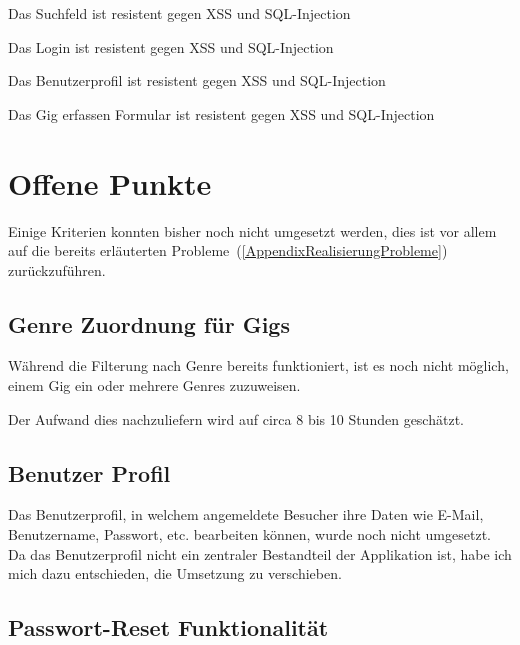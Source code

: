 \clearpage

{Das Suchfeld ist resistent gegen XSS und SQL-Injection}

{Das Login ist resistent gegen XSS und SQL-Injection}

\clearpage

{Das Benutzerprofil ist resistent gegen XSS und SQL-Injection}

{Das Gig erfassen Formular ist resistent gegen XSS und SQL-Injection}

\clearpage
\section{Offene Punkte}

Einige Kriterien konnten bisher noch nicht umgesetzt werden, dies ist vor allem
auf die bereits erläuterten Probleme~(\ref{AppendixRealisierungProbleme})
zurückzuführen.

\subsection{Genre Zuordnung für Gigs}

Während die Filterung nach Genre bereits funktioniert, ist es noch nicht
möglich, einem Gig ein oder mehrere Genres zuzuweisen.

Der Aufwand dies nachzuliefern wird auf circa 8 bis 10 Stunden geschätzt.

\subsection{Benutzer Profil}

Das Benutzerprofil, in welchem angemeldete Besucher ihre Daten wie E-Mail,
Benutzername, Passwort, etc. bearbeiten können, wurde noch nicht umgesetzt.
Da das Benutzerprofil nicht ein zentraler Bestandteil der Applikation ist,
habe ich mich dazu entschieden, die Umsetzung zu verschieben.

\subsection{Passwort-Reset Funktionalität}

